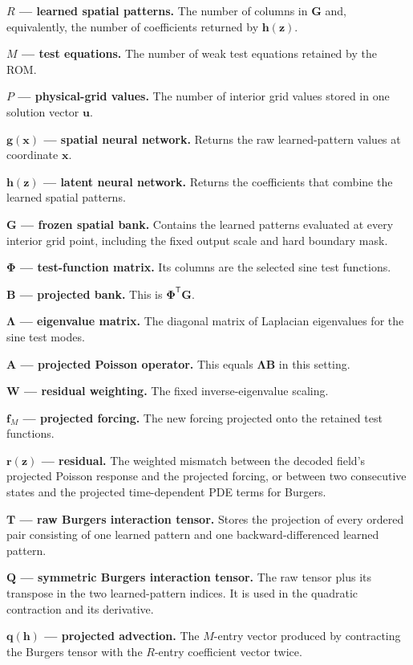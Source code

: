 \documentclass[11pt]{article}
\newcommand{\mat}[1]{\mathbf{#1}}
\newcommand{\vect}[1]{\mathbf{#1}}
\begin{document}
\textbf{$R$ --- learned spatial patterns.}
The number of columns in $\mat{G}$ and, equivalently, the number of
coefficients returned by $\vect{h}(\vect{z})$.

\textbf{$M$ --- test equations.}
The number of weak test equations retained by the ROM.

\textbf{$P$ --- physical-grid values.}
The number of interior grid values stored in one solution vector $\vect{u}$.

\textbf{$\vect{g}(\vect{x})$ --- spatial neural network.}
Returns the raw learned-pattern values at coordinate $\vect{x}$.

\textbf{$\vect{h}(\vect{z})$ --- latent neural network.}
Returns the coefficients that combine the learned spatial patterns.

\textbf{$\mat{G}$ --- frozen spatial bank.}
Contains the learned patterns evaluated at every interior grid point,
including the fixed output scale and hard boundary mask.

\textbf{$\mat{\Phi}$ --- test-function matrix.}
Its columns are the selected sine test functions.

\textbf{$\mat{B}$ --- projected bank.}
This is $\mat{\Phi}^{\mathsf T}\mat{G}$.

\textbf{$\mat{\Lambda}$ --- eigenvalue matrix.}
The diagonal matrix of Laplacian eigenvalues for the sine test modes.

\textbf{$\mat{A}$ --- projected Poisson operator.}
This equals $\mat{\Lambda}\mat{B}$ in this setting.

\textbf{$\mat{W}$ --- residual weighting.}
The fixed inverse-eigenvalue scaling.

\textbf{$\vect{f}_M$ --- projected forcing.}
The new forcing projected onto the retained test functions.

\textbf{$\vect{r}(\vect{z})$ --- residual.}
The weighted mismatch between the decoded field's projected Poisson response
and the projected forcing, or between two consecutive states and the projected
time-dependent PDE terms for Burgers.

\textbf{$\mat{T}$ --- raw Burgers interaction tensor.}
Stores the projection of every ordered pair consisting of one learned pattern
and one backward-differenced learned pattern.

\textbf{$\mat{Q}$ --- symmetric Burgers interaction tensor.}
The raw tensor plus its transpose in the two learned-pattern indices.  It is
used in the quadratic contraction and its derivative.

\textbf{$\vect{q}(\vect{h})$ --- projected advection.}
The $M$-entry vector produced by contracting the Burgers tensor with the
$R$-entry coefficient vector twice.
\end{document}
